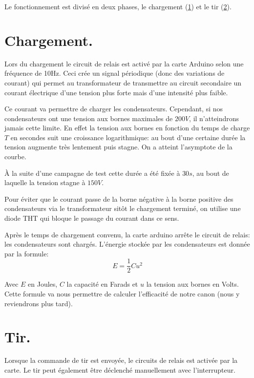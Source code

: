 Le fonctionnement est divisé en deux phases, le chargement (\ref{gauss_charg}) et le
tir (\ref{gauss_tir}).

\section{Chargement.} \label{gauss_charg}

Lors du chargement le circuit de relais est activé par la
carte Arduino selon une fréquence de 10Hz. Ceci crée un
signal périodique (donc des variations de courant) qui permet
au transformateur de transmettre au circuit secondaire un
courant électrique d'une tension plus forte mais d'une
intensité plus faible.

Ce courant va permettre de charger les condensateurs.
Cependant, si nos condensateurs ont une tension aux bornes
maximales de $200 V$, il n'atteindrons jamais cette limite. En
effet la tension aux bornes en fonction du temps de charge $T$ en
secondes suit une croissance logarithmique: au bout d'une
certaine durée la tension augmente très lentement puis stagne.
On a atteint l'asymptote de la courbe.

À la suite d'une campagne de test cette durée a été fixée à $30
s$, au bout de laquelle la tension stagne à $150 V$.

Pour éviter que le courant passe de la borne négative à la borne
positive des condensateurs via le transformateur sitôt le
chargement terminé, on utilise une diode THT qui bloque le
passage du courant dans ce sens.

Après le temps de chargement convenu, la carte arduino
arrête le circuit de relais: les condensateurs sont
chargés. L'énergie stockée par les condensateurs est donnée par
la formule:
\begin{equation}
	E = \frac{1}{2}Cu^2
\end{equation}

Avec $E$ en Joules, $C$ la capacité en Farads et $u$ la tension aux
bornes en   Volts. Cette formule va nous permettre de calculer
l'efficacité de notre   canon (nous y reviendrons plus tard).

\section{Tir.} \label{gauss_tir}

Lorsque la commande de tir est envoyée, le circuits de relais
 est activée par la carte. Le tir peut également être
déclenché manuellement avec l'interrupteur.

